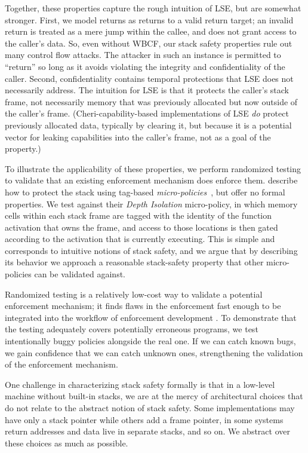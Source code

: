 \documentclass[acmsmall,review,anonymous]{acmart}\settopmatter{printfolios=true,printccs=false,printacmref=false}
\begin{document}
Together, these properties capture the rough intuition of LSE, but are somewhat stronger.
First, we model returns as returns to a valid return target; an invalid return
is treated as a mere jump within the callee, and does not grant access to the caller's
data. So, even without WBCF, our stack safety properties rule out many control flow attacks.
The attacker in such an instance is permitted to ``return'' so long as it avoids
violating the integrity and confidentiality of the caller. Second, confidentiality
contains temporal protections that LSE does not necessarily address. The intuition
for LSE is that it protects the caller's stack frame, not necessarily memory that was
previously allocated but now outside of the caller's frame. (Cheri-capability-based
implementations of LSE {\em do} protect previously allocated data, typically by clearing
it, but because it is a potential vector for leaking capabilities into the caller's frame,
not as a goal of the property.)

To illustrate the applicability of these properties, we perform randomized testing to
validate that an existing enforcement mechanism does enforce them.
\citet{DBLP:conf/sp/RoesslerD18} describe how to protect the stack
using tag-based \emph{micro-policies}~\citep{pump_oakland2015}, but offer no formal properties.
We test against their {\em Depth Isolation} micro-policy, in which memory cells within each stack
frame are tagged with the identity of the function activation
that owns the frame, and access to those locations is then gated
according to the activation that is currently executing. This is simple and corresponds
to intuitive notions of stack safety, and we argue that by describing its behavior
we approach a reasonable stack-safety property that other micro-policies can be
validated against.

Randomized testing is a relatively low-cost way to validate a potential enforcement
mechanism; it finds flaws in the enforcement fast enough to be integrated into the workflow
of enforcement development \citep{TestingNI:ICFP}. To demonstrate that the testing adequately
covers potentially erroneous programs, we test intentionally buggy policies alongside
the real one. If we can catch known bugs, we gain confidence that we can catch unknown ones,
strengthening the validation of the enforcement mechanism.

One challenge in characterizing stack safety formally is that in a low-level machine
without built-in stacks, we are at the mercy of architectural
choices that do not relate to the abstract notion of stack safety. Some implementations
may have only a stack pointer while others add a frame pointer, in some systems return
addresses and data live in separate stacks, and so on. We abstract over these choices
as much as possible.
\end{document}
